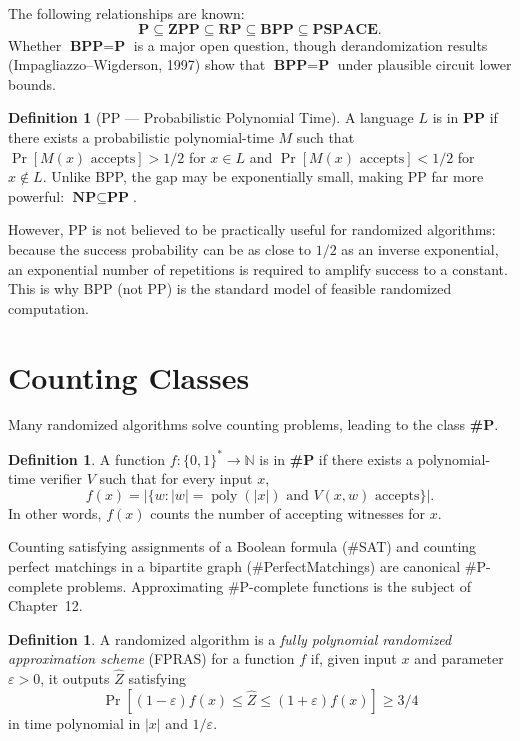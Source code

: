 \documentclass[twoside,12pt]{book}
\theoremstyle{plain}
\theoremstyle{definition}
\newtheorem{definition}[theorem]{Definition}
\theoremstyle{remark}
\begin{document}
The following relationships are known:
\[
\textbf{P} \subseteq \textbf{ZPP} \subseteq \textbf{RP} \subseteq
\textbf{BPP} \subseteq \textbf{PSPACE}.
\]
Whether $\textbf{BPP} = \textbf{P}$ is a major open question, though
derandomization results (Impagliazzo--Wigderson, 1997) show that
$\textbf{BPP} = \textbf{P}$ under plausible circuit lower bounds.

\begin{definition}[PP --- Probabilistic Polynomial Time]
A language $L$ is in \textbf{PP} if there exists a probabilistic
polynomial-time $M$ such that $\Pr[M(x) \text{ accepts}] > 1/2$ for
$x \in L$ and $\Pr[M(x) \text{ accepts}] < 1/2$ for $x \notin L$.
Unlike BPP, the gap may be exponentially small, making PP far more
powerful: $\textbf{NP} \subseteq \textbf{PP}$.

However, PP is not believed to be practically useful for randomized
algorithms: because the success probability can be as close to $1/2$
as an inverse exponential, an exponential number of repetitions is
required to amplify success to a constant. This is why BPP (not PP) is
the standard model of feasible randomized computation.
\end{definition}

\section{Counting Classes}
\label{app:sec:counting}

Many randomized algorithms solve counting problems, leading to the
class \textbf{\#P}.

\begin{definition}
A function $f: \{0,1\}^* \to \mathbb{N}$ is in \textbf{\#P} if there
exists a polynomial-time verifier $V$ such that for every input $x$,
\[
f(x) = |\{w : |w| = \operatorname{poly}(|x|) \text{ and } V(x,w) \text{ accepts}\}|.
\]
In other words, $f(x)$ counts the number of accepting witnesses for $x$.
\end{definition}

Counting satisfying assignments of a Boolean formula (\#SAT) and
counting perfect matchings in a bipartite graph (\#PerfectMatchings)
are canonical \#P-complete problems. Approximating \#P-complete
functions is the subject of Chapter~12.

\begin{definition}
A randomized algorithm is a \emph{fully polynomial randomized
approximation scheme} (FPRAS) for a function $f$ if, given input $x$ and
parameter $\varepsilon > 0$, it outputs $\hat{Z}$ satisfying
\[
\Pr[(1-\varepsilon)f(x) \leq \hat{Z} \leq (1+\varepsilon)f(x)] \geq 3/4
\]
in time polynomial in $|x|$ and $1/\varepsilon$.
\end{definition}
\end{document}
